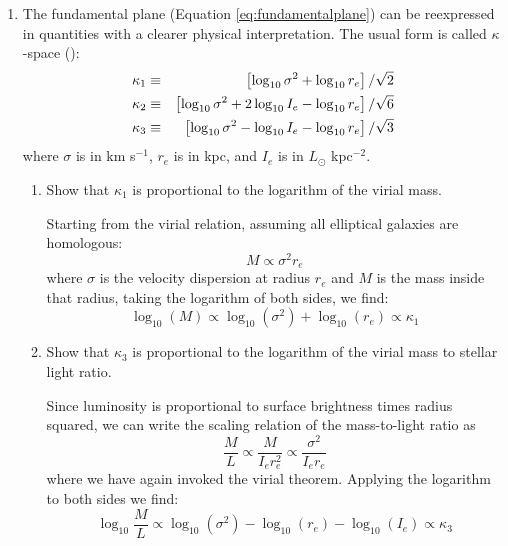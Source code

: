 \begin{enumerate}
\item The fundamental plane (Equation \ref{eq:fundamentalplane}) can
be reexpressed in quantities with a clearer physical
interpretation. The usual form is called $\kappa$-space
(\citealt{bender92a}): 
\begin{eqnarray}
\kappa_1 &\equiv& \left[ \log_{10} \sigma^2 + \log_{10} r_e \right]
/ \sqrt{2} \cr
\kappa_2 &\equiv& \left[ \log_{10} \sigma^2 + 2 \log_{10} I_e
- \log_{10} r_e \right] / \sqrt{6} \cr
\kappa_3 &\equiv& \left[ \log_{10} \sigma^2 - \log_{10} I_e
- \log_{10} r_e \right] / \sqrt{3}
\end{eqnarray}
where $\sigma$ is in km s$^{-1}$, $r_e$ is in kpc, and $I_e$ is in
$L_\odot$ kpc$^{-2}$. 
\begin{enumerate}
\item Show that $\kappa_1$ is proportional to the logarithm of the
virial mass.

\begin{answer}
Starting from the virial relation, assuming all elliptical galaxies
are homologous:
\begin{equation}
M \propto  \sigma^2 r_e
\end{equation}
where $\sigma$ is the velocity dispersion at radius $r_{e}$ and $M$ is
the mass inside that radius, taking the logarithm of both sides, we
find:
\begin{equation}
\log_{10}(M) \propto \log_{10}(\sigma^2) + \log_{10}(r_{e}) \propto \kappa_1
\end{equation}
\end{answer}

\item Show that $\kappa_3$ is proportional to the logarithm of the
virial mass to stellar light ratio.

\begin{answer}
Since luminosity is proportional to surface brightness times radius
squared, we can write the scaling relation of the mass-to-light ratio
as
\begin{equation}
\frac{M}{L} \propto \frac{M}{I_e r_e^2} \propto \frac{\sigma^2}{I_e r_e} 
\end{equation}
where we have again invoked the virial theorem. Applying the logarithm
to both sides we find:
\begin{equation}
\log_{10}\frac{M}{L} \propto \log_{10}(\sigma^2) - \log_{10}(r_{e}) - \log_{10}(I_e) \propto \kappa_3
\end{equation}
\end{answer}


\end{enumerate}
\end{enumerate}
